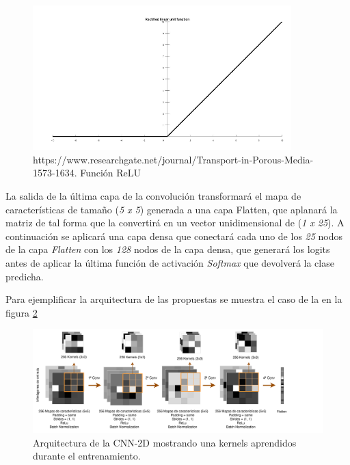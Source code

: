 \begin{enumerate}
\begin{enumerate}
                    \begin{figure}[h]
                        \centering
                        \includegraphics[width=10cm]{archivos/CNN/RELUImage}
                        \caption{https://www.researchgate.net/journal/Transport-in-Porous-Media-1573-1634. Función ReLU}
                        \label{RELUImage}
                     \end{figure}

                    La salida de la última capa de la convolución transformará el mapa de características de tamaño (\textit{5 x 5}) generada a una capa Flatten, que aplanará la matriz de tal forma que la convertirá en un vector unidimensional de (\textit{1 x 25}). A continuación se aplicará una capa densa que conectará cada uno de los \textit{25} nodos de la capa \textit{Flatten} con los \textit{128} nodos de la capa densa, que generará los logits antes de aplicar la última función de activación \textit{Softmax} que devolverá la clase predicha.


                    Para ejemplificar la arquitectura de las  propuestas se muestra el caso de la  en la figura \ref{TASPCNNIMAGE}


                    \begin{figure}[h]
                        \centering
                        \includegraphics[width=17cm]{archivos/CNN/2D/TASCNN}
                        \caption{Arquitectura de la CNN-2D mostrando una  kernels aprendidos durante el entrenamiento.}
                        \label{TASPCNNIMAGE}
                     \end{figure}


            \end{enumerate}

            \cite{AutoSklearn}

    \end{enumerate}


